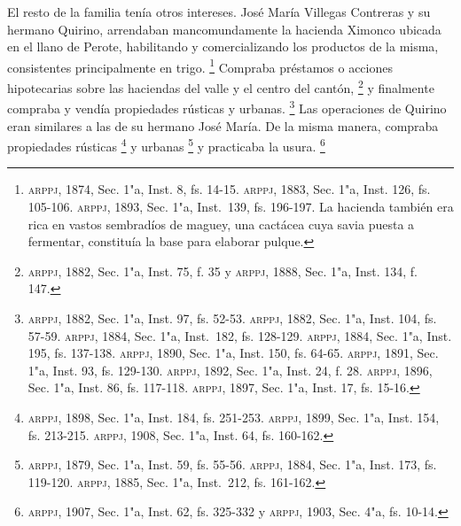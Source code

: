 \documentclass[14pt,twoside,final]{extbook} %
\let\oldfootnote\footnote
\renewcommand\footnote[1]{%
\oldfootnote{\hspace{1mm}#1}}
\begin{document}
El resto de la familia tenía otros intereses. José María Villegas Contreras y su hermano Quirino, arrendaban mancomundamente la hacienda Ximonco ubicada en el llano de Perote, habilitando y comercializando los productos de la misma, consistentes principalmente en trigo.\footnote{\textsc{arppj}, 1874, Sec. 1"a, Inst. 8, fs. 14-15. \textsc{arppj}, 1883, Sec. 1"a, Inst. 126, fs. 105-106. \textsc{arppj}, 1893, Sec. 1"a, Inst.~139, fs. 196-197. La hacienda\index[lugares]{Ximonco!hacienda} también era rica en vastos sembradíos de maguey, una cactácea cuya savia puesta a fermentar, constituía la base para elaborar pulque.} Compraba préstamos o acciones hipotecarias sobre las haciendas del valle y el centro del cantón,\footnote{\textsc{arppj}, 1882, Sec. 1"a, Inst. 75, f. 35 y \textsc{arppj}, 1888, Sec. 1"a, Inst. 134, f. 147.} y finalmente compraba y vendía propiedades rústicas y urbanas.\footnote{\textsc{arppj}, 1882, Sec. 1"a, Inst. 97, fs. 52-53. \textsc{arppj}, 1882, Sec. 1"a, Inst. 104, fs. 57-59. \textsc{arppj}, 1884, Sec. 1"a, Inst.~182, fs. 128-129. \textsc{arppj}, 1884, Sec. 1"a, Inst. 195, fs. 137-138. \textsc{arppj}, 1890, Sec. 1"a, Inst. 150, fs. 64-65. \textsc{arppj}, 1891, Sec. 1"a, Inst. 93, fs. 129-130. \textsc{arppj}, 1892, Sec. 1"a, Inst. 24, f. 28. \textsc{arppj}, 1896, Sec. 1"a, Inst. 86, fs. 117-118. \textsc{arppj}, 1897, Sec. 1"a, Inst. 17, fs. 15-16.} Las operaciones de Quirino eran similares a las de su hermano José María. De la misma manera, compraba propiedades rústicas\footnote{\textsc{arppj}, 1898, Sec. 1"a, Inst. 184, fs. 251-253. \textsc{arppj}, 1899, Sec. 1"a, Inst. 154, fs. 213-215. \textsc{arppj}, 1908, Sec. 1"a, Inst. 64, fs. 160-162.} y urbanas\footnote{\textsc{arppj}, 1879, Sec. 1"a, Inst. 59, fs. 55-56. \textsc{arppj}, 1884, Sec. 1"a, Inst. 173, fs. 119-120. \textsc{arppj}, 1885, Sec. 1"a, Inst.~212, fs. 161-162.} y practicaba la usura.\footnote{\textsc{arppj}, 1907, Sec. 1"a, Inst. 62, fs. 325-332 y \textsc{arppj}, 1903, Sec. 4"a, fs. 10-14.}
\end{document}

